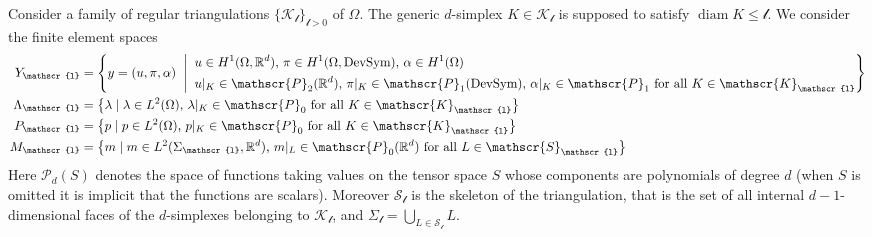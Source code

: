 \documentclass[a4paper,10pt,twoside]{amsbook}
\numberwithin{section}{chapter}
\numberwithin{equation}{chapter}
\theoremstyle{definition}
\DeclareMathOperator{\diam}{diam}
\begin{document}
Consider a family of regular triangulations $\{\mathscr{K}_\mathscr{l}\}_{\mathscr{l}>0}$ of $\Omega$. The generic $d$-simplex $K\in\mathscr{K}_\mathscr{l}$ is supposed to satisfy $\diam K\le\mathscr{l}$. We consider the finite element spaces
\begin{align*}
Y_\mathscr{l}&=\Biggl\{y=(u,\pi,\alpha)\;\Biggm|\;
\begin{aligned}
& \text{$u\in H^1(\Omega,\mathbb{R}^d)$, $\pi\in H^1(\Omega,\text{DevSym})$, $\alpha\in H^1(\Omega)$} \\
& \text{$u|_K\in\mathscr{P}_2(\mathbb{R}^d)$, $\pi|_K\in\mathscr{P}_1(\text{DevSym})$, $\alpha|_K\in\mathscr{P}_1$ for all $K\in\mathscr{K}_\mathscr{l}$}
\end{aligned}\Biggr\} \\
\Lambda_\mathscr{l}&=\left\{\lambda\;|\;\text{$\lambda\in L^2(\Omega)$, $\lambda|_K\in\mathscr{P}_0$ for all $K\in\mathscr{K}_\mathscr{l}$}\right\} \\
P_\mathscr{l}&=\left\{p\;|\;\text{$p\in L^2(\Omega)$, $p|_K\in\mathscr{P}_0$ for all $K\in\mathscr{K}_\mathscr{l}$}\right\} \\
M_\mathscr{l}&=\left\{m\;|\;\text{$m\in L^2(\Sigma_\mathscr{l},\mathbb{R}^d)$, $m|_L\in\mathscr{P}_0(\mathbb{R}^d)$ for all $L\in\mathscr{S}_\mathscr{l}$}\right\}
\end{align*}
Here $\mathscr{P}_d(S)$ denotes the space of functions taking values on the tensor space $S$ whose components are polynomials of degree $d$ (when $S$ is omitted it is implicit that the functions are scalars). Moreover $\mathscr{S}_\mathscr{l}$ is the skeleton of the triangulation, that is the set of all internal $d-1$-dimensional faces of the $d$-simplexes belonging to $\mathscr{K}_\mathscr{l}$, and $\Sigma_\mathscr{l}=\bigcup_{L\in\mathscr{S}_\mathscr{l}}L$.
\end{document}
